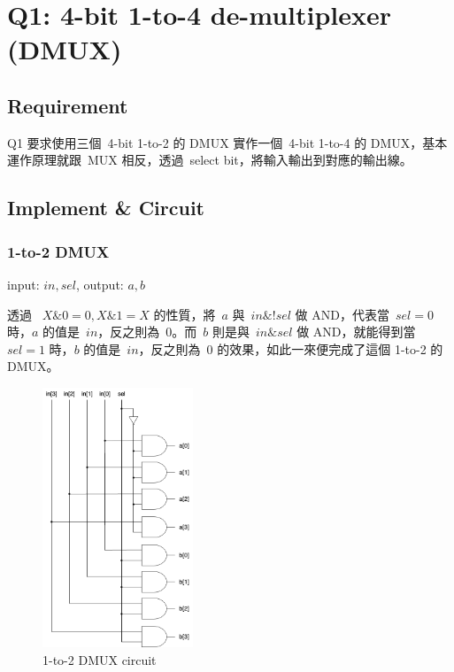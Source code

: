 \documentclass[10.5pt,compsoc,UTF8]{CjC}
\theoremstyle{mystyle}
\begin{document}
\section{Q1: 4-bit 1-to-4 de-multiplexer (DMUX)}

\subsection{Requirement}
Q1 要求使用三個\ 4-bit 1-to-2 的 DMUX 實作一個\ 4-bit 1-to-4 的 DMUX，基本運作原理就跟\ MUX 相反，透過\ select bit，將輸入輸出到對應的輸出線。

  

\subsection{Implement \& Circuit}
\subsubsection*{1-to-2 DMUX}

input: $in, sel$, output: $a, b$
\par

透過 \ $X \& 0 = 0, X \& 1 = X$ 的性質，將\ $a$ 與\ $in \& !sel$ 做 AND，代表當\ $sel = 0$ 時，$a$ 的值是\ $in$，反之則為\ $0$。而\ $b$ 則是與\ $in \& sel$ 做 AND，就能得到當\ $sel = 1$ 時，$b$ 的值是\ $in$，反之則為\ $0$ 的效果，如此一來便完成了這個 1-to-2 的 DMUX。

\begin{figure}[h]
    \centering
    \includegraphics[width=0.4\textwidth]{1-to-2 DMUX.png}
      \caption{1-to-2 DMUX circuit}
    \label{fig:1-to-2-DMUX}
\end{figure}
\end{document}
